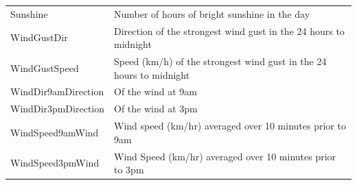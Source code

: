 \begin{longtable}[]{@{}ll@{}}
\begin{minipage}[t]{0.52\columnwidth}\raggedright
Sunshine\strut
\end{minipage} & \begin{minipage}[t]{0.43\columnwidth}\raggedright
Number of hours of bright sunshine in the day\strut
\end{minipage}\tabularnewline
\begin{minipage}[t]{0.52\columnwidth}\raggedright
WindGustDir\strut
\end{minipage} & \begin{minipage}[t]{0.43\columnwidth}\raggedright
Direction of the strongest wind gust in the 24 hours to midnight\strut
\end{minipage}\tabularnewline
\begin{minipage}[t]{0.52\columnwidth}\raggedright
WindGustSpeed\strut
\end{minipage} & \begin{minipage}[t]{0.43\columnwidth}\raggedright
Speed (km/h) of the strongest wind gust in the 24 hours to
midnight\strut
\end{minipage}\tabularnewline
\begin{minipage}[t]{0.52\columnwidth}\raggedright
WindDir9amDirection\strut
\end{minipage} & \begin{minipage}[t]{0.43\columnwidth}\raggedright
Of the wind at 9am\strut
\end{minipage}\tabularnewline
\begin{minipage}[t]{0.52\columnwidth}\raggedright
WindDir3pmDirection\strut
\end{minipage} & \begin{minipage}[t]{0.43\columnwidth}\raggedright
Of the wind at 3pm\strut
\end{minipage}\tabularnewline
\begin{minipage}[t]{0.52\columnwidth}\raggedright
WindSpeed9amWind\strut
\end{minipage} & \begin{minipage}[t]{0.43\columnwidth}\raggedright
Wind speed (km/hr) averaged over 10 minutes prior to 9am\strut
\end{minipage}\tabularnewline
\begin{minipage}[t]{0.52\columnwidth}\raggedright
WindSpeed3pmWind\strut
\end{minipage} & \begin{minipage}[t]{0.43\columnwidth}\raggedright
Wind Speed (km/hr) averaged over 10 minutes prior to 3pm\strut

\end{minipage}
\end{longtable}
